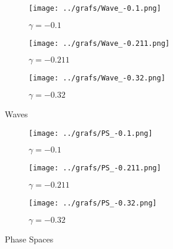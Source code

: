 \documentclass[12pt, a4paper]{article}
\begin{document}
\begin{figure}[!h]
     \centering
     \begin{subfigure}[b]{0.3\textwidth}
         \centering
         \texttt{[image: ../grafs/Wave\_-0.1.png]}
         \caption{$\gamma=-0.1$}
         \label{fig:y equals x}
     \end{subfigure}
     \hfill
     \begin{subfigure}[b]{0.3\textwidth}
         \centering
         \texttt{[image: ../grafs/Wave\_-0.211.png]}
         \caption{$\gamma=-0.211$}
         \label{fig:three sin x}
     \end{subfigure}
     \hfill
     \begin{subfigure}[b]{0.3\textwidth}
         \centering
         \texttt{[image: ../grafs/Wave\_-0.32.png]}
         \caption{$\gamma=-0.32$}
         \label{fig:five over x}
     \end{subfigure}
        \caption{Waves}
        \label{fig:three graphs}
\end{figure}


\begin{figure}[!h]
     \centering
     \begin{subfigure}[b]{0.3\textwidth}
         \centering
         \texttt{[image: ../grafs/PS\_-0.1.png]}
         \caption{$\gamma=-0.1$}
         \label{fig:y equals x}
     \end{subfigure}
     \hfill
     \begin{subfigure}[b]{0.3\textwidth}
         \centering
         \texttt{[image: ../grafs/PS\_-0.211.png]}
         \caption{$\gamma=-0.211$}
         \label{fig:three sin x}
     \end{subfigure}
     \hfill
     \begin{subfigure}[b]{0.3\textwidth}
         \centering
         \texttt{[image: ../grafs/PS\_-0.32.png]}
         \caption{$\gamma=-0.32$}
         \label{fig:five over x}
     \end{subfigure}
        \caption{Phase Spaces}
        \label{fig:three graphs}
\end{figure}
\end{document}
